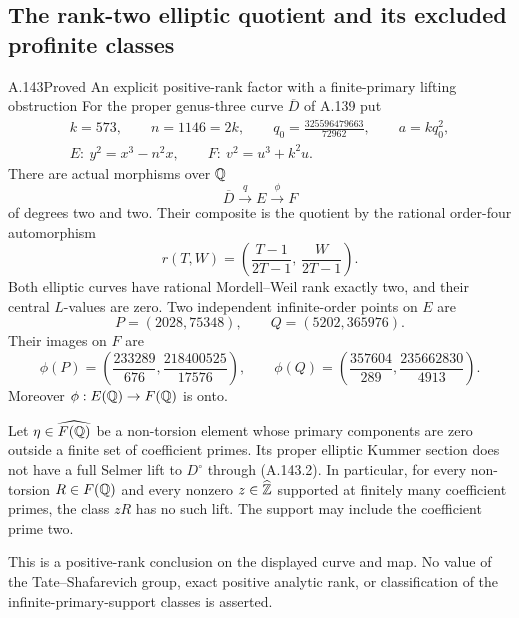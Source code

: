 \subsection{The rank-two elliptic quotient and its excluded profinite classes}

\begin{statement}{A.143}{Proved}
{An explicit positive-rank factor with a finite-primary lifting obstruction}
For the proper genus-three curve \(\overline D\) of A.139 put
\[
 \begin{gathered}
 k=573,\qquad n=1146=2k,\qquad
 q_0=\frac{325596479663}{72962},\qquad a=kq_0^2,\\
 E:\ y^2=x^3-n^2x,\qquad F:\ v^2=u^3+k^2u.
 \end{gathered}
\tag{A.143.1}
\]
There are actual morphisms over \(\mathbb Q\)
\[
              \overline D\xrightarrow{\ q\ }E
                         \xrightarrow{\ \phi\ }F
\tag{A.143.2}
\]
of degrees two and two.  Their composite is the quotient by the
rational order-four automorphism
\[
 r(T,W)=\left(\frac{T-1}{2T-1},\,\frac{W}{2T-1}\right).
\tag{A.143.3}
\]
Both elliptic curves have rational Mordell--Weil rank exactly two,
and their central \(L\)-values are zero.
Two independent infinite-order points on \(E\) are
\[
                   P=(2028,75348),\qquad Q=(5202,365976).
\tag{A.143.4}
\]
Their images on \(F\) are
\[
 \phi(P)=\left(\frac{233289}{676},\frac{218400525}{17576}\right),
 \qquad
 \phi(Q)=\left(\frac{357604}{289},\frac{235662830}{4913}\right).
\tag{A.143.5}
\]
Moreover \(\phi:E(\mathbb Q)\to F(\mathbb Q)\) is onto.

Let \(\eta\in\widehat{F(\mathbb Q)}\) be a non-torsion element whose
primary components are zero outside a finite set of coefficient
primes.  Its proper elliptic Kummer section does not have a full
Selmer lift to \(D^\circ\) through (A.143.2).
In particular, for every non-torsion \(R\in F(\mathbb Q)\) and every
nonzero \(z\in\widehat{\mathbb Z}\) supported at finitely many coefficient
primes, the class \(zR\) has no such lift.  The support may include
the coefficient prime two.

This is a positive-rank conclusion on the displayed curve and map.
No value of the Tate--Shafarevich group, exact positive analytic
rank, or classification of the infinite-primary-support classes
is asserted.
\end{statement}


